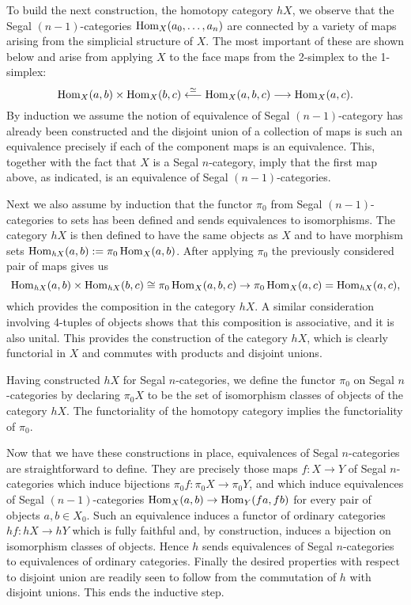 \documentclass{amsart}
\begin{document}
To build the next construction,  the homotopy category $\mathit{h}X$, we observe that the Segal $(n-1)$-categories $\operatorname{Hom}_X(a_0, \dots, a_n)$ are connected by a variety of maps arising from the simplicial structure of $X$. The most important of these are shown below and arise from applying $X$ to the face maps from the 2-simplex to the 1-simplex:
\begin{equation*}
	\operatorname{Hom}_X(a,b) \times \operatorname{Hom}_X(b,c) \stackrel{\simeq}{\longleftarrow} \operatorname{Hom}_X(a,b,c) \stackrel{}{\longrightarrow} \operatorname{Hom}_X(a,c).
\end{equation*}
By induction we assume the notion of equivalence of Segal $(n-1)$-category has already been constructed and the disjoint union of a collection of maps is such an equivalence precisely if each of the component maps is an equivalence. This, together with the fact that $X$ is a Segal $n$-category, imply that the first map above, as indicated, is an equivalence of Segal $(n-1)$-categories. 
 
Next we also assume by induction that the functor $\pi_0$ from Segal $(n-1)$-categories to sets has been defined and sends equivalences to isomorphisms. The category $\mathit{h}X$ is then defined to have the same objects as $X$ and to have morphism sets $\operatorname{Hom}_{\mathit{h}X}(a,b) := \pi_0 \operatorname{Hom}_X(a,b)$. After applying $\pi_0$ the previously considered pair of maps gives us
\begin{equation*}
	 \operatorname{Hom}_{\mathit{h}X}(a,b) \times \operatorname{Hom}_{\mathit{h}X}(b,c) \cong \pi_0 \operatorname{Hom}_X(a,b,c)\to \pi_0 \operatorname{Hom}_X(a,c) = \operatorname{Hom}_{\mathit{h}X}(a,c),
\end{equation*}
which provides the composition in the category $\mathit{h}X$. A similar consideration involving 4-tuples of objects shows that this composition is associative, and it is also unital.  
This provides the construction of the category $\mathit{h}X$, which is clearly functorial in $X$ and commutes with products and  disjoint unions.  

Having constructed $\mathit{h}X$ for Segal $n$-categories, we define the functor $\pi_0$ on Segal $n$-categories by declaring $\pi_0 X$ to be the set of isomorphism classes of objects of the category $\mathit{h}X$. The functoriality of the homotopy category implies the functoriality of $\pi_0$. 

Now that we have these constructions in place, equivalences of Segal $n$-categories are straightforward to define. They are precisely those maps $f:X \to Y$ of Segal $n$-categories which induce bijections $\pi_0 f: \pi_0 X \to \pi_0 Y$, 
and which induce equivalences of Segal $(n-1)$-categories $\operatorname{Hom}_X(a,b) \to \operatorname{Hom}_Y(fa, fb)$ for every pair of objects $a,b \in X_0$. Such an equivalence induces a functor of ordinary categories $\mathit{h}f:\mathit{h}X \to \mathit{h}Y$ which is fully faithful and, by construction, induces a bijection on isomorphism classes of objects. Hence $\mathit{h}$ sends equivalences of Segal $n$-categories to equivalences of ordinary categories. Finally the desired properties with respect to disjoint union are readily seen to follow from the commutation of $\mathit{h}$ with disjoint unions. This ends the inductive step. 
\end{document}
